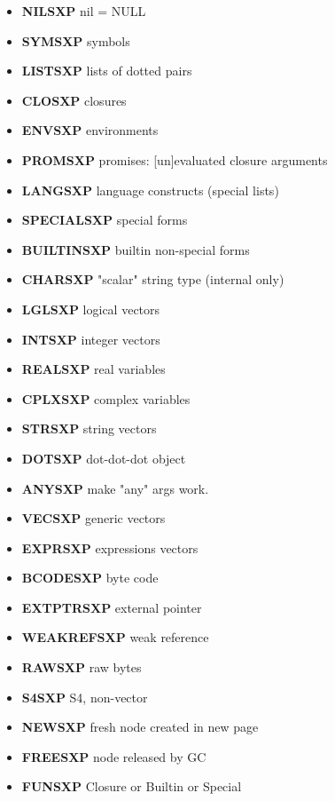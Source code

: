 \documentclass[thesis=M,english]{FITthesis}[2018/10/20]
\begin{document}
\begin{itemize}
	\item \textbf{NILSXP} nil = NULL
	\item \textbf{SYMSXP}	     symbols
	\item \textbf{LISTSXP}	     lists of dotted pairs
	\item \textbf{CLOSXP}	     closures
	\item \textbf{ENVSXP}	     environments
	\item \textbf{PROMSXP}	     promises: [un]evaluated closure arguments
	\item \textbf{LANGSXP}	     language constructs (special lists)
	\item \textbf{SPECIALSXP}   	special forms
	\item \textbf{BUILTINSXP}   	builtin non-special forms
	\item \textbf{CHARSXP}	     "scalar" string type (internal only)
	\item \textbf{LGLSXP}	    logical vectors
	\item \textbf{INTSXP}	    integer vectors
	\item \textbf{REALSXP}	    real variables
	\item \textbf{CPLXSXP}	    complex variables
	\item \textbf{STRSXP}	    string vectors
	\item \textbf{DOTSXP}	    dot-dot-dot object
	\item \textbf{ANYSXP}	    make "any" args work.
	\item \textbf{VECSXP}	    generic vectors
	\item \textbf{EXPRSXP}	    expressions vectors
	\item \textbf{BCODESXP}    byte code
	\item \textbf{EXTPTRSXP}   external pointer
	\item \textbf{WEAKREFSXP}  weak reference
	\item \textbf{RAWSXP}      raw bytes
	\item \textbf{S4SXP}       S4, non-vector
	\item \textbf{NEWSXP}      fresh node created in new page
	\item \textbf{FREESXP}     node released by GC

	\item \textbf{FUNSXP}      Closure or Builtin or Special
\end{itemize}
\end{document}
